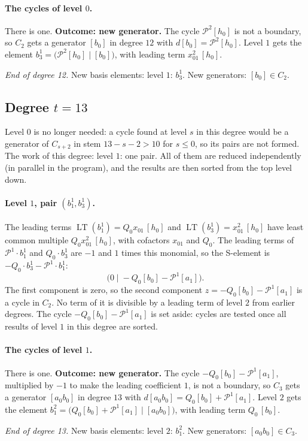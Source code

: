 \documentclass[11pt]{article}
\renewcommand{\P}{\mathcal{P}}
\DeclareMathOperator{\LT}{LT}
\begin{document}
\paragraph{The cycles of level $0$.} There is one.
\textbf{Outcome: new generator.} The cycle $\P^{2}[h_0]$ is not a boundary, so $C_{2}$ gets a generator $[b_0]$ in degree $12$ with $d[b_0] = \P^{2}[h_0]$.
Level $1$ gets the element $b^{1}_{3} = \bigl(\P^{2}[h_0] \;\big|\; [b_0]\bigr)$, with leading term $x_{01}^{2}\,[h_0]$.
\medskip
\par\noindent\emph{End of degree 12.} New basis elements: level $1$: $b^{1}_{3}$. New generators: $[b_0]\in C_{2}$.
\subsection*{Degree $t = 13$}
\noindent Level $0$ is no longer needed: a cycle found at level $s$ in this degree would be a generator of $C_{s+2}$ in stem $13-s-2 > 10$ for $s \le 0$, so its pairs are not formed.
\noindent The work of this degree: level $1$: one pair. All of them are reduced independently (in parallel in the program), and the results are then sorted from the top level down.
\medskip
\paragraph{Level $1$, pair $(b^{1}_{1}, b^{1}_{3})$.} The leading terms $\LT(b^{1}_{1}) = Q_{0}x_{01}\,[h_0]$ and $\LT(b^{1}_{3}) = x_{01}^{2}\,[h_0]$ have least common multiple $Q_{0}x_{01}^{2}\,[h_0]$, with cofactors $x_{01}$ and $Q_{0}$.
The leading terms of $\P^{1}\cdot b^{1}_{1}$ and $Q_{0}\cdot b^{1}_{3}$ are $-1$ and $1$ times this monomial, so the S-element is $-Q_{0}\cdot b^{1}_{3} - \P^{1}\cdot b^{1}_{1}$:
\[\bigl(0 \;\big|\; -Q_{0}[b_0] - \P^{1}[a_1]\bigr).\]
The first component is zero, so the second component $z = -Q_{0}[b_0] - \P^{1}[a_1]$ is a cycle in $C_{2}$.
No term of it is divisible by a leading term of level $2$ from earlier degrees.
The cycle $-Q_{0}[b_0] - \P^{1}[a_1]$ is set aside: cycles are tested once all results of level $1$ in this degree are sorted.
\medskip
\paragraph{The cycles of level $1$.} There is one.
\textbf{Outcome: new generator.} The cycle $-Q_{0}[b_0] - \P^{1}[a_1]$, multiplied by $-1$ to make the leading coefficient $1$, is not a boundary, so $C_{3}$ gets a generator $[a_0b_0]$ in degree $13$ with $d[a_0b_0] = Q_{0}[b_0] + \P^{1}[a_1]$.
Level $2$ gets the element $b^{2}_{1} = \bigl(Q_{0}[b_0] + \P^{1}[a_1] \;\big|\; [a_0b_0]\bigr)$, with leading term $Q_{0}\,[b_0]$.
\medskip
\par\noindent\emph{End of degree 13.} New basis elements: level $2$: $b^{2}_{1}$. New generators: $[a_0b_0]\in C_{3}$.
\end{document}
